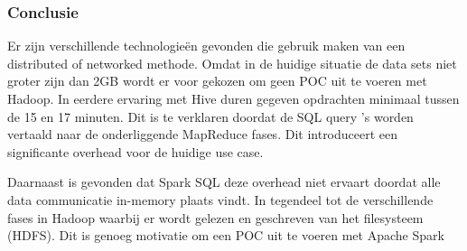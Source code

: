 \subsubsection{\textbf{Conclusie}}

Er zijn verschillende technologieën gevonden die gebruik maken van een distributed of networked methode. Omdat in de huidige situatie de data sets niet groter zijn dan 2GB wordt er voor gekozen om geen POC uit te voeren met Hadoop.  In eerdere ervaring met Hive duren gegeven opdrachten minimaal tussen de 15 en 17 minuten. Dit is te verklaren doordat de SQL query 's worden vertaald naar de onderliggende MapReduce fases. \parencite{thusoo2010hive} Dit introduceert een significante overhead voor de huidige use case.

Daarnaast is gevonden dat Spark SQL deze overhead niet ervaart doordat alle data communicatie in-memory plaats vindt. In tegendeel tot de verschillende fases in Hadoop waarbij er wordt gelezen en geschreven van het filesysteem (HDFS). Dit is genoeg motivatie om een POC uit te voeren met Apache Spark
